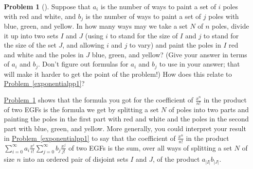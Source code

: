 \documentclass[10pt,]{book}
\theoremstyle{plain}
\theoremstyle{definition}
\newtheorem{activity}[project]{Problem}
\theoremstyle{definition}
\numberwithin{equation}{chapter}
\begin{document}
\begin{activity}[] \label{exponentialpp2}
\hypertarget{p-2113}{}%
Suppose that \(a_i\) is the number of ways to paint a set of \(i\) poles with red and white, and \(b_j\) is the number of ways to paint a set of \(j\) poles with blue, green, and yellow. In how many ways may we take a set \(N\) of \(n\) poles, divide it up into two sets \(I\) and \(J\) (using \(i\) to stand for the size of \(I\) and \(j\) to stand for the size of the set \(J\), and allowing \(i\) and \(j\) to vary) and paint the poles in \(I\) red and white and the poles in \(J\) blue, green, and yellow? (Give your answer in terms of \(a_i\) and \(b_j\).  Don't figure out formulas for  \(a_i\) and \(b_j\) to use in your answer; that will make it harder to get the point of the problem!) How does this relate to \hyperref[exponentialpp1]{Problem~\ref{exponentialpp1}}?%
\end{activity}
\hypertarget{p-2115}{}%
\hyperref[exponentialpp2]{Problem~\ref{exponentialpp2}} shows that the formula you got for the coefficient of \(\frac{x^n}{n!}\) in the product of two EGFs is the formula we get by splitting a set \(N\) of poles into two parts and painting the poles in the first part with red and white and the poles in the second part with blue, green, and yellow.  More generally, you could interpret your result in \hyperref[exponentialpp1]{Problem~\ref{exponentialpp1}} to say that the coefficient of \(\frac{x^n}{n!}\) in the product \(\sum_{i=0}^\infty a_i \frac{x^i}{i!}
\sum_{j=0}^\infty b_j\frac{x^j}{j!}\) of two EGFs is the sum, over all ways of splitting a set \(N\) of size \(n\) into an ordered pair of disjoint sets \(I\) and \(J\), of the product \(a_{|I|}b_{|J|}\).%
\par
\hypertarget{p-2116}{}%
\end{document}
